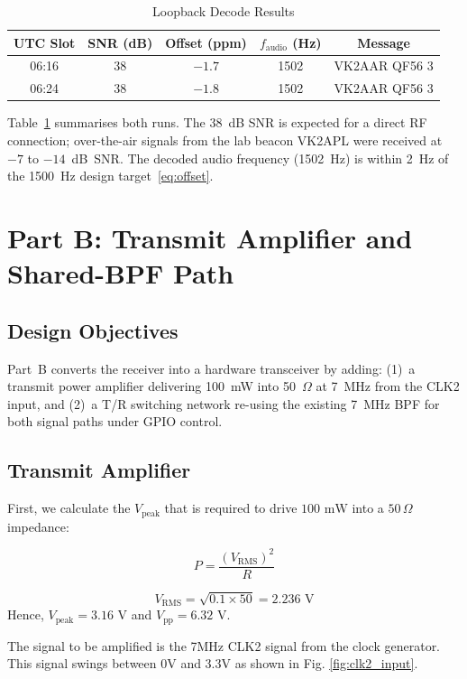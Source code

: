 \documentclass[conference]{IEEEtran}
\begin{document}
\begin{table}[H]
  \centering
  \caption{Loopback Decode Results}
  \label{tab:results}
  \begin{tabular}{ccccc}
    \toprule
    UTC Slot & SNR (dB) & Offset (ppm) & $f_\text{audio}$ (Hz) & Message \\
    \midrule
    06:16 & 38 & $-1.7$ & 1502 & VK2AAR QF56 3 \\
    06:24 & 38 & $-1.8$ & 1502 & VK2AAR QF56 3 \\
    \bottomrule
  \end{tabular}
\end{table}

Table~\ref{tab:results} summarises both runs. The 38~dB SNR is expected for a
direct RF connection; over-the-air signals from the lab beacon VK2APL were received
at $-7$ to $-14$~dB~SNR. The decoded audio frequency (1502~Hz) is within 2~Hz of
the 1500~Hz design target~\eqref{eq:offset}.

\section{Part B: Transmit Amplifier and Shared-BPF Path}

\subsection{Design Objectives}

Part~B converts the receiver into a hardware transceiver by adding: (1)~a transmit
power amplifier delivering 100~mW into 50~$\Omega$ at 7~MHz from the CLK2 input,
and (2)~a T/R switching network re-using the existing 7~MHz BPF for both signal
paths under GPIO control.

\subsection{Transmit Amplifier}

First, we calculate the $V_{\text{peak}}$ that is required to drive $100\text{ mW}$ into a $50\,\Omega$ impedance:

$$P = \frac{(V_{\text{RMS}})^2}{R}$$

$$V_{\text{RMS}} = \sqrt{0.1 \times 50} = 2.236\text{ V}$$
Hence, $V_{\text{peak}} = 3.16\text{ V}$ and $V_{\text{pp}} = 6.32\text{ V}$.

The signal to be amplified is the 7MHz CLK2 signal from the clock generator. 
This signal swings between 0V and 3.3V as shown in Fig. \ref{fig:clk2_input}.
\end{document}
